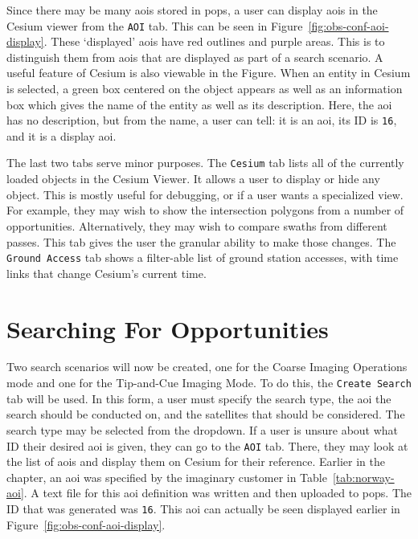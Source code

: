 Since there may be many \glspl{aoi} stored in \gls{pops}, a user can display
\glspl{aoi} in the Cesium viewer from the \texttt{AOI} tab. This can be seen in
Figure~\ref{fig:obs-conf-aoi-display}. These `displayed' \glspl{aoi} have red
outlines and purple areas. This is to distinguish them from \glspl{aoi} that
are displayed as part of a search scenario. A useful feature of Cesium is also
viewable in the Figure. When an entity in Cesium is selected, a green box
centered on the object appears as well as an information box which gives the
name of the entity as well as its description. Here, the \gls{aoi} has no
description, but from the name, a user can tell: it is an \gls{aoi}, its ID is
\texttt{16}, and it is a display \gls{aoi}.


The last two tabs serve minor purposes. The \texttt{Cesium} tab lists all of
the currently loaded objects in the Cesium Viewer. It allows a user to display
or hide any object. This is mostly useful for debugging, or if a user wants a
specialized view. For example, they may wish to show the intersection polygons
from a number of opportunities. Alternatively, they may wish to compare swaths
from different passes. This tab gives the user the granular ability to make
those changes. The \texttt{Ground Access} tab shows a filter-able list of
ground station accesses, with time links that change Cesium's current time.


\section{Searching For Opportunities}

Two search scenarios will now be created, one for the Coarse Imaging Operations
mode and one for the Tip-and-Cue Imaging Mode. To do this, the \texttt{Create
Search} tab will be used. In this form, a user must specify the search type,
the \gls{aoi} the search should be conducted on, and the  satellites that
should be considered.  The search type may be selected from the dropdown. If a
user is unsure about what ID their desired \gls{aoi} is given, they can go to
the \texttt{AOI} tab.  There, they may look at the list of \glspl{aoi} and
display them on Cesium for their reference. Earlier in the chapter, an
\gls{aoi} was specified by the imaginary customer in
Table~\ref{tab:norway-aoi}. A text file for this \gls{aoi} definition was
written and then uploaded to \gls{pops}. The ID that was generated was
\texttt{16}. This \gls{aoi} can actually be seen displayed earlier in
Figure~\ref{fig:obs-conf-aoi-display}. 

